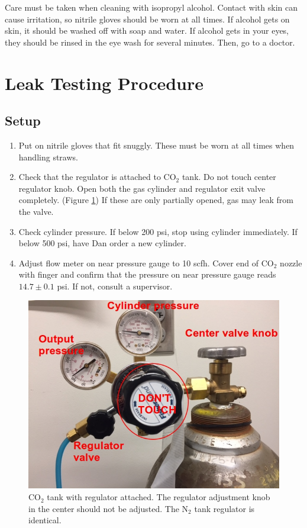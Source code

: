\documentclass[A4,12pt]{article}
\begin{document}
Care must be taken when cleaning with isopropyl alcohol. Contact with skin can cause irritation, so nitrile gloves should be worn at all times. If alcohol gets on skin, it should be washed off with soap and water. If alcohol gets in your eyes, they should be rinsed in the eye wash for several minutes. Then, go to a doctor.


\newpage

\section{Leak Testing Procedure}

\subsection{Setup}

\begin{enumerate}
	\item Put on nitrile gloves that fit snuggly. These must be worn at all times when handling straws.
	\item Check that the regulator is attached to CO$_2$ tank. Do not touch center regulator knob. Open both the gas cylinder and regulator exit valve completely. (Figure \ref{co2tank}) If these are only partially opened, gas may leak from the valve.   
	\item Check cylinder pressure. If below 200 psi, stop using cylinder immediately. If below 500 psi, have Dan order a new cylinder.
	\item Adjust flow meter on near pressure gauge to 10 scfh. Cover end of CO$_2$ nozzle with finger and confirm that the pressure on near pressure gauge reads $14.7 \pm 0.1$ psi. If not, consult a supervisor.
\end{enumerate}

\begin{figure}
	\center
	\includegraphics[scale=0.5]{co2tank}
	\caption{CO$_2$ tank with regulator attached. The regulator adjustment knob in the center should not be adjusted. The N$_2$ tank regulator is identical.} \label{co2tank}
\end{figure}
\end{document}
